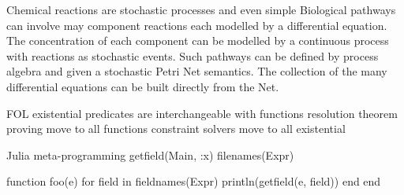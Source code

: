 Chemical reactions are stochastic processes and even simple Biological pathways can involve may component reactions each modelled by a differential equation. The concentration of each component can be modelled by a continuous process with reactions as stochastic events. Such pathways  can be defined by process algebra and given a stochastic Petri Net semantics. The collection of the many differential equations can be built directly from the Net.







FOL   existential predicates are interchangeable with functions
resolution theorem proving move to all functions
        constraint solvers move to all existential   

Julia meta-programming
     getfield(Main, :x)   filenames(Expr)     

function foo(e)
   for field in fieldnames(Expr)
      println(getfield(e, field))
   end 
end